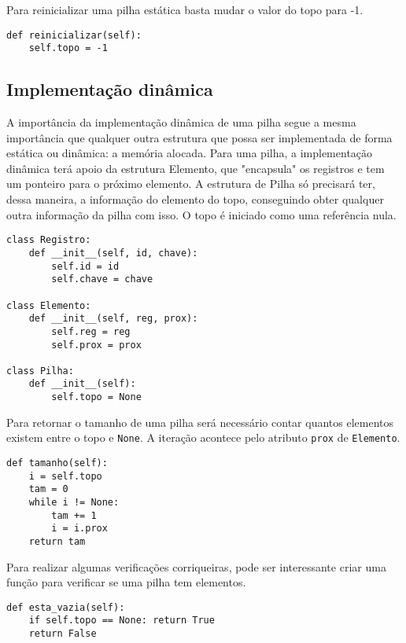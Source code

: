 \documentclass[a4paper, twocolumn]{article}
\theoremstyle{definition}
\begin{document}
Para reinicializar uma pilha estática basta mudar o valor do topo para -1.
\begin{lstlisting}[label=pilha_tamanho, caption= Pilha estática (reinicializar)]
def reinicializar(self):
    self.topo = -1
\end{lstlisting}

\subsection{Implementação dinâmica}
A importância da implementação dinâmica de uma pilha segue a mesma importância que qualquer outra estrutura que possa ser implementada de forma estática ou dinâmica: a memória alocada. Para uma pilha, a implementação dinâmica terá apoio da estrutura Elemento, que "encapsula" os registros e tem um ponteiro para o próximo elemento. A estrutura de Pilha só precisará ter, dessa maneira, a informação do elemento do topo, conseguindo obter qualquer outra informação da pilha com isso. O topo é iniciado como uma referência nula.

\begin{lstlisting}[label=pilha_din_estrutura, caption= Pilha dinâmica (estrutura)]
class Registro:
    def __init__(self, id, chave):
        self.id = id
        self.chave = chave

class Elemento:
    def __init__(self, reg, prox):
        self.reg = reg
        self.prox = prox

class Pilha:
    def __init__(self):
        self.topo = None
\end{lstlisting}

Para retornar o tamanho de uma pilha será necessário contar quantos elementos existem entre o topo e \texttt{None}. A iteração acontece pelo atributo \texttt{prox} de \texttt{Elemento}.

\begin{lstlisting}[label=pilha_din_tamanho, caption= Pilha dinâmica (tamanho)]
def tamanho(self):
    i = self.topo
    tam = 0
    while i != None:
        tam += 1
        i = i.prox
    return tam
\end{lstlisting}

Para realizar algumas verificações corriqueiras, pode ser interessante criar uma função para verificar se uma pilha tem elementos.
\begin{lstlisting}[label=pilha_din_esta_vazia, caption= Pilha dinâmica (está vazia?)]
def esta_vazia(self):
    if self.topo == None: return True
    return False
\end{lstlisting}
\end{document}
